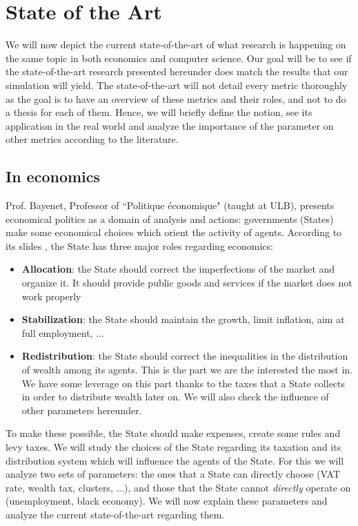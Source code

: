 \chapter{State of the Art}\label{section:state_of_the_art}

We will now depict the current state-of-the-art of what research is happening on the same topic in both economics and computer science.
Our goal will be to see if the state-of-the-art research presented hereunder does match the results that our simulation will yield. The state-of-the-art will not detail every metric thoroughly as the goal is to have an overview of these metrics and their roles, and not to do a thesis for each of them. Hence, we will briefly define the notion, see its application in the real world and analyze the importance of the parameter on other metrics according to the literature.

\section{In economics}

Prof. Bayenet, Professor of ``Politique économique" (taught at ULB), presents economical politics as a domain of analysis and actions: governments (States) make some economical choices which orient the activity of agents. According to its slides \cite{bayenetSlides1}, the State has three major roles regarding economics:

\begin{itemize}
    \item \textbf{Allocation}: the State should correct the imperfections of the market and organize it. It should provide public goods and services if the market does not work properly
    \item \textbf{Stabilization}: the State should maintain the growth, limit inflation, aim at full employment, ... 
    \item \textbf{Redistribution}: the State should correct the inequalities in the distribution of wealth among its agents. This is the part we are the interested the most in. We have some leverage on this part thanks to the taxes that a State collects in order to distribute wealth later on. We will also check the influence of other parameters hereunder.
\end{itemize} 

To make these possible, the State should make expenses, create some rules and levy taxes. We will study the choices of the State regarding its taxation and its distribution system which will influence the agents of the State. For this we will analyze two sets of parameters: the ones that a State can directly choose (VAT rate, wealth tax, clusters, ...), and those that the State cannot \emph{directly} operate on (unemployment, black economy). We will now explain these parameters and analyze the current state-of-the-art regarding them.

